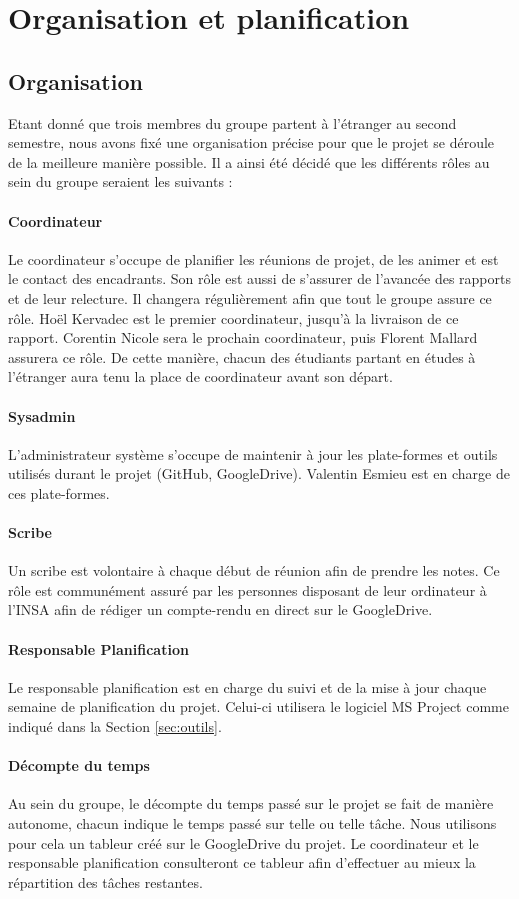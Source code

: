 \section{Organisation et planification}
	\subsection{Organisation}
	    Etant donné que trois membres du groupe partent à l'étranger au second semestre, nous avons fixé une organisation précise pour que le projet se déroule de la meilleure manière possible. Il a ainsi été décidé que les différents rôles au sein du groupe seraient les suivants :
	    \paragraph{Coordinateur} Le coordinateur s'occupe de planifier les réunions de projet, de les animer et est le contact des encadrants. Son rôle est aussi de s'assurer de l'avancée des rapports et de leur relecture. Il changera régulièrement afin que tout le groupe assure ce rôle. Hoël Kervadec est le premier coordinateur, jusqu'à la livraison de ce rapport. Corentin Nicole sera le prochain coordinateur, puis Florent Mallard assurera ce rôle. De cette manière, chacun des étudiants partant en études à l'étranger aura tenu la place de coordinateur avant son départ.
	    \paragraph{Sysadmin} L'administrateur système s'occupe de maintenir à jour les plate-formes et outils utilisés durant le projet (GitHub, GoogleDrive). Valentin Esmieu est en charge de ces plate-formes.
	    \paragraph{Scribe} Un scribe est volontaire à chaque début de réunion afin de prendre les notes. Ce rôle est communément assuré par les personnes disposant de leur ordinateur à l'INSA afin de rédiger un compte-rendu en direct sur le GoogleDrive.
	    \paragraph{Responsable Planification} Le responsable planification est en charge du suivi et de la mise à jour chaque semaine de planification du projet. Celui-ci utilisera le logiciel MS Project comme indiqué dans la Section \ref{sec:outils}.
	    \paragraph{Décompte du temps} Au sein du groupe, le décompte du temps passé sur le projet se fait de manière autonome, chacun indique le temps passé sur telle ou telle tâche. Nous utilisons pour cela un tableur créé sur le GoogleDrive du projet. Le coordinateur et le responsable planification consulteront ce tableur afin d'effectuer au mieux la répartition des tâches restantes.

